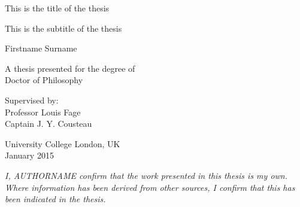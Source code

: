 \documentclass[12pt,a4paper,]{report}
\begin{document}
\begin{titlepage}
    \begin{center}


        \vspace*{2.5cm}

        \huge
        This is the title of the thesis

                \vspace{.5cm}

        \Large
        This is the subtitle of the thesis
        

        \vspace{1.5cm}

        \Large
        Firstname Surname

        \vspace{1.5cm}

        \normalsize
        A thesis presented for the degree of\\
        Doctor of Philosophy

        \vfill

        \normalsize
        Supervised by:\\
        Professor Louis Fage \\ Captain J. Y. Cousteau

        \vspace{0.8cm}


        \normalsize
        University College London, UK\\
        January 2015


    \end{center}
\end{titlepage}


\vspace*{\fill}

\noindent \textit{
I, AUTHORNAME confirm that the work presented in this thesis is my own. Where information has been derived from other sources, I confirm that this has been indicated in the thesis.
} \vspace*{\fill}  \newpage
\end{document}
